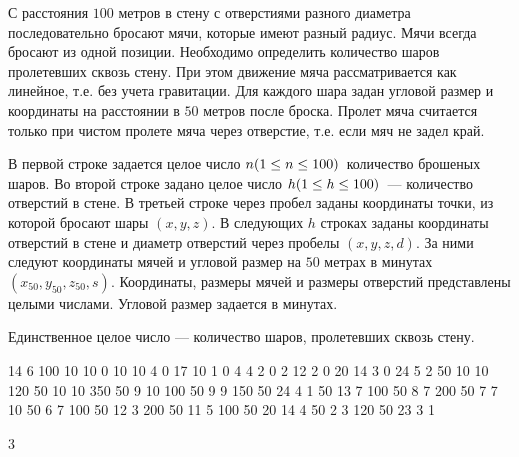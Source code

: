 
С расстояния $100$ метров в стену с отверстиями разного диаметра последовательно бросают мячи, которые имеют разный радиус. Мячи всегда бросают из одной позиции. Необходимо определить количество шаров пролетевших сквозь стену. При этом движение мяча рассматривается как линейное, т.е. без учета гравитации. Для каждого шара задан угловой размер и координаты на расстоянии в $50$ метров после броска. Пролет мяча считается только при чистом пролете мяча через отверстие, т.е. если мяч не задел край.


В первой строке задается целое число $n\space (1\leq n\leq 100)$ количество брошеных шаров. Во второй строке задано целое число $h\space(1\leq h\leq 100)$ — количество отверстий в стене. В третьей строке через пробел заданы координаты точки, из которой бросают шары $(x, y, z)$. В следующих $h$ строках заданы координаты отверстий в стене и диаметр отверстий через пробелы $(x, y, z, d)$. За ними следуют координаты мячей и угловой размер на $50$ метрах в минутах $(x_{50}, y_{50}, z_{50}, s)$. Координаты, размеры мячей и размеры отверстий представлены целыми числами. Угловой размер задается в минутах.

\outputfmtSection

Единственное целое число — количество шаров, пролетевших сквозь стену.


\begin{myverbbox}[\small]{\vinput}
    14
    6
    100 10 10
    0 10 10 4
    0 17 10 1
    0 4 4 2
    0 2 12 2
    0 20 14 3
    0 24 5 2
    50 10 10 120
    50 10 10 350
    50 9 10 100
    50 9 9 150
    50 24 4 1
    50 13 7 100
    50 8 7 200
    50 7 7 10
    50 6 7 100
    50 12 3 200
    50 11 5 100
    50 20 14 4
    50 2 3 120
    50 23 3 1
\end{myverbbox}
\begin{myverbbox}[\small]{\voutput}
    3
\end{myverbbox}

